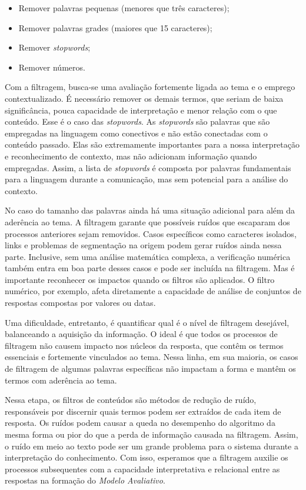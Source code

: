\begin{itemize}
	\item Remover palavras pequenas (menores que três caracteres);
	\item Remover palavras grades (maiores que 15 caracteres);
	\item Remover \textit{stopwords};
	\item Remover números.
\end{itemize}

Com a filtragem, busca-se uma avaliação fortemente ligada ao tema e o emprego contextualizado. É necessário remover os demais termos, que seriam de baixa significância, pouca capacidade de interpretação e menor relação com o que conteúdo. Esse é o caso das \textit{stopwords}. As \textit{stopwords} são palavras que são empregadas na linguagem como conectivos e não estão conectadas com o conteúdo passado. Elas são extremamente importantes para a nossa interpretação e reconhecimento de contexto, mas não adicionam informação quando empregadas. Assim, a lista de \textit{stopwords} é composta por palavras fundamentais para a linguagem durante a comunicação, mas sem potencial para a análise do contexto.

No caso do tamanho das palavras ainda há uma situação adicional para além da aderência ao tema. A filtragem garante que possíveis ruídos que escaparam dos processos anteriores sejam removidos. Casos específicos como caracteres isolados, links e problemas de segmentação na origem podem gerar ruídos ainda nessa parte. Inclusive, sem uma análise matemática complexa, a verificação numérica também entra em boa parte desses casos e pode ser incluída na filtragem. Mas é importante reconhecer os impactos quando os filtros são aplicados. O filtro numérico, por exemplo, afeta diretamente a capacidade de análise de conjuntos de respostas compostas por valores ou datas. 

Uma dificuldade, entretanto, é quantificar qual é o nível de filtragem desejável, balanceando a aquisição da informação. O ideal é que todos os processos de filtragem não causem impacto nos núcleos da resposta, que contêm os termos essenciais e fortemente vinculados ao tema. Nessa linha, em sua maioria, os casos de filtragem de algumas palavras específicas não impactam a forma e mantêm os termos com aderência ao tema.

Nessa etapa, os filtros de conteúdos são métodos de redução de ruído, responsáveis por discernir quais termos podem ser extraídos de cada item de resposta. Os ruídos podem causar a queda no desempenho do algoritmo da mesma forma ou pior do que a perda de informação causada na filtragem. Assim, o ruído em meio ao texto pode ser um grande problema para o sistema durante a interpretação do conhecimento. Com isso, esperamos que a filtragem auxilie os processos subsequentes com a capacidade interpretativa e relacional entre as respostas na formação do \textit{Modelo Avaliativo}.


